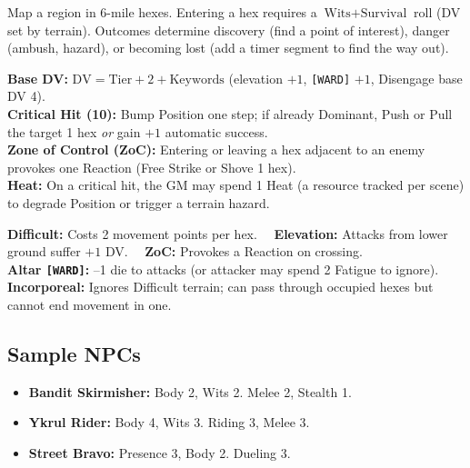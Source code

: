\begin{tcolorbox}[title=Hex-Based Exploration, colback=white!97!gray, colframe=black!80!gray,breakable]
Map a region in 6-mile hexes. Entering a hex requires a \(\text{Wits}+\text{Survival}\) roll (DV set by terrain). Outcomes determine discovery (find a point of interest), danger (ambush, hazard), or becoming lost (add a timer segment to find the way out).
\end{tcolorbox}

\begin{tcolorbox}[title=Miniatures Mode --- Speed Defaults, colback=white!98!gray, colframe=black!80!gray,breakable]
\textbf{Base DV:} \(\mathrm{DV}=\mathrm{Tier}+2+\text{Keywords}\) (elevation \(+1\), \texttt{[WARD]} \(+1\), Disengage base DV 4).\\
\textbf{Critical Hit (10):} Bump Position one step; if already Dominant, Push or Pull the target 1 hex \emph{or} gain \(+1\) automatic success.\\
\textbf{Zone of Control (ZoC):} Entering or leaving a hex adjacent to an enemy provokes one Reaction (Free Strike or Shove 1 hex).\\
\textbf{Heat:} On a critical hit, the GM may spend 1 Heat (a resource tracked per scene) to degrade Position or trigger a terrain hazard.
\end{tcolorbox}

\begin{tcolorbox}[title=Hex Keywords, colback=white!98!gray, colframe=black!80!gray,breakable]
\textbf{Difficult:} Costs 2 movement points per hex. 
\textbf{Elevation:} Attacks from lower ground suffer \(+1\) DV. 
\textbf{ZoC:} Provokes a Reaction on crossing.\\
\textbf{Altar \texttt{[WARD]}:} --1 die to attacks (or attacker may spend 2 Fatigue to ignore).\\
\textbf{Incorporeal:} Ignores Difficult terrain; can pass through occupied hexes but cannot end movement in one.
\end{tcolorbox}

\subsection*{Sample NPCs}
\label{sec:sample-npcs}

\begin{tcolorbox}[title=Encounters (Tier I--II), colback=white!97!gray,breakable]
\begin{itemize}
  \item \textbf{Bandit Skirmisher:} Body 2, Wits 2. Melee 2, Stealth 1.
  \item \textbf{Ykrul Rider:} Body 4, Wits 3. Riding 3, Melee 3.
  \item \textbf{Street Bravo:} Presence 3, Body 2. Dueling 3.
\end{itemize}
\end{tcolorbox}

